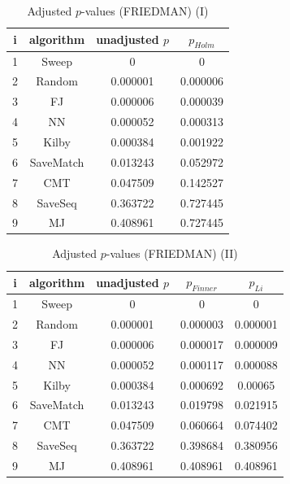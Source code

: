 \documentclass[a4paper,10pt]{article}
\begin{document}
\begin{landscape}
\begin{table}[!htp]
\centering\small
\begin{tabular}{cccc}
i&algorithm&unadjusted $p$&$p_{Holm}$\\
\hline1&Sweep&0&0\\2&Random&0.000001&0.000006\\3&FJ&0.000006&0.000039\\4&NN&0.000052&0.000313\\5&Kilby&0.000384&0.001922\\6&SaveMatch&0.013243&0.052972\\7&CMT&0.047509&0.142527\\8&SaveSeq&0.363722&0.727445\\9&MJ&0.408961&0.727445\\\hline
\end{tabular}
\caption{Adjusted $p$-values (FRIEDMAN) (I)}
\end{table}
\begin{table}[!htp]
\centering\small
\begin{tabular}{ccccc}
i&algorithm&unadjusted $p$&$p_{Finner}$&$p_{Li}$\\
\hline1&Sweep&0&0&0\\2&Random&0.000001&0.000003&0.000001\\3&FJ&0.000006&0.000017&0.000009\\4&NN&0.000052&0.000117&0.000088\\5&Kilby&0.000384&0.000692&0.00065\\6&SaveMatch&0.013243&0.019798&0.021915\\7&CMT&0.047509&0.060664&0.074402\\8&SaveSeq&0.363722&0.398684&0.380956\\9&MJ&0.408961&0.408961&0.408961\\\hline
\end{tabular}
\caption{Adjusted $p$-values (FRIEDMAN) (II)}
\end{table}

\newpage
\end{landscape}
\end{document}
